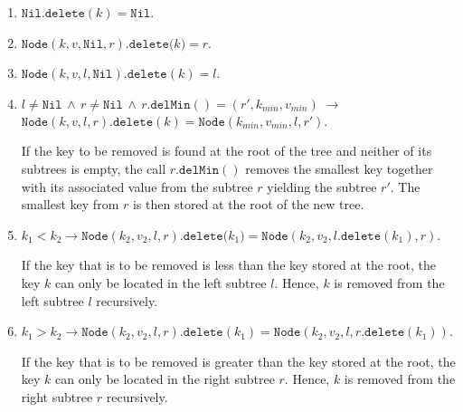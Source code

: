 \begin{enumerate}
\item $\texttt{Nil}.\texttt{delete}(k) = \texttt{Nil}$.
\item $\texttt{Node}(k,v,\texttt{Nil},r).\texttt{delete}\bigl(k\bigr) = r$.
\item $\texttt{Node}(k,v,l,\texttt{Nil}).\texttt{delete}(k) = l$.
\item $l \not= \texttt{Nil} \,\wedge\, r \not= \texttt{Nil} \,\wedge\, r.\texttt{delMin}() = (r',k_{min}, v_{min})  \;\rightarrow$ \\[0.2cm]
      \hspace*{1.3cm}
      $\texttt{Node}(k,v,l,r).\texttt{delete}(k) = \texttt{Node}(k_{min},v_{min},l,r')$.
      
      If the key to be removed is found at the root of the tree and neither of its subtrees is
      empty, the call  $r\mathtt{.}\texttt{delMin}()$ removes the smallest key together with its
      associated value from the subtree $r$ yielding the subtree $r'$.
      The smallest key from $r$ is then stored at the root of the new tree.

\item $k_1 < k_2 \rightarrow \texttt{Node}(k_2,v_2,l,r).\texttt{delete}\bigl(k_1) = 
       \texttt{Node}(k_2,v_2,l.\texttt{delete}(k_1),r)$.

       If the key that is to be removed is less than the key stored at the root, the key $k$ can only be
       located in the left subtree $l$.  Hence, $k$ is removed from the left subtree $l$ recursively.
\item $k_1 > k_2 \rightarrow \texttt{Node}(k_2,v_2,l,r).\texttt{delete}(k_1) = 
       \texttt{Node}(k_2,v_2,l,r.\texttt{delete}(k_1))$.

       If the key that is to be removed is greater than the key stored at the root, the key $k$ can only be
       located in the right subtree $r$.  Hence, $k$ is removed from the right subtree $r$ recursively.
\end{enumerate}

